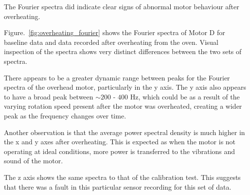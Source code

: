 The Fourier spectra did indicate clear signs of abnormal motor behaviour after overheating. 

Figure.~\ref{fig:overheating_fourier} shows the Fourier spectra of Motor D for baseline data and data recorded after overheating from the oven. Visual inspection of the spectra shows very distinct differences between the two sets of spectra. 

There appears to be a greater dynamic range between peaks for the Fourier spectra of the overhead motor, particularly in the y axis. The y axis also appears to have a broad peak between $\sim200$ - $400$ Hz, which could be as a result of the varying rotation speed present after the motor was overheated, creating a wider peak as the frequency changes over time.

Another observation is that the average power spectral density is much higher in the x and y axes after overheating. This is expected as when the motor is not operating at ideal conditions, more power is transferred to the vibrations and sound of the motor.

The z axis shows the same spectra to that of the calibration test. This suggests that there was a fault in this particular sensor recording for this set of data.

